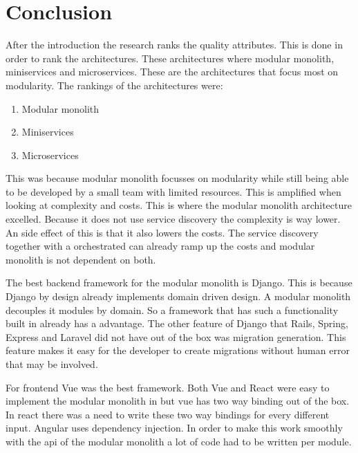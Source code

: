 \chapter{Conclusion}

After the introduction the research ranks the quality attributes. This is done in order to rank the architectures. These architectures where modular monolith, miniservices and microservices. These are the architectures that focus most on modularity. The rankings of the architectures were:
\begin{enumerate}
  \item Modular monolith
  \item Miniservices
  \item Microservices
\end{enumerate}

This was because modular monolith focusses on modularity while still being able to be developed by a small team with limited resources. This is amplified when looking at complexity and costs. This is where the modular monolith architecture excelled. Because it does not use service discovery the complexity is way lower. An side effect of this is that it also lowers the costs. The service discovery together with a orchestrated can already ramp up the costs and modular monolith is not dependent on both.

The best backend framework for the modular monolith is Django. This is because Django by design already implements domain driven design. A modular monolith decouples it modules by domain. So a framework that has such a functionality built in already has a advantage. The other feature of Django that Rails, Spring, Express and Laravel did not have out of the box was migration generation. This feature makes it easy for the developer to create migrations without human error that may be involved.

For frontend Vue was the best framework. Both Vue and React were easy to implement the modular monolith in but vue has two way binding out of the box. In react there was a need to write these two way bindings for every different input. Angular uses dependency injection. In order to make this work smoothly with the api of the modular monolith a lot of code had to be written per module.
